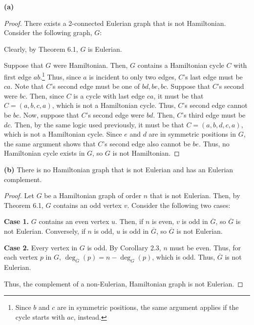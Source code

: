 \documentclass[12pt]{article}
\begin{document}
{\bf (a)}
\begin{proof} There exists a 2-connected Eulerian graph that is not Hamiltonian.
	Consider the following graph, $G$:
	\begin{center}
	\end{center}

	Clearly, by Theorem 6.1, $G$ is Eulerian.

	Suppose that $G$ were Hamiltonian.
	Then, $G$ contains a Hamiltonian cycle $C$ with first edge $ab$.\footnote{Since $b$ and $c$ are in symmetric positions, the same argument applies if the cycle starts with $ac$, instead.}
	Thus, since $a$ is incident to only two edges, $C$'s last edge must be $ca$.
	Note that $C$'s second edge must be one of $bd, be, bc$.
	Suppose that $C$'s second were $bc$.
	Then, since $C$ is a cycle with last edge $ca$, it must be that $C = (a, b, c, a)$, which is not a Hamiltonian cycle.
	Thus, $C$'s second edge cannot be $bc$.
	Now, suppose that $C$'s second edge were $bd$.
	Then, $C$'s third edge must be $dc$.
	Then, by the same logic used previously, it must be that $C = (a, b, d, c, a)$, which is not a Hamiltonian cycle.
	Since $e$ and $d$ are in symmetric positions in $G$, the same argument shows that $C$'s second edge also cannot be $be$.
	Thus, no Hamiltonian cycle exists in $G$, so $G$ is not Hamiltonian.
\end{proof}

{\bf (b)} There is no Hamiltonian graph that is not Eulerian and has an Eulerian complement.
\begin{proof}
	Let $G$ be a Hamiltonian graph of order $n$ that is not Eulerian.
	Then, by Theorem 6.1, $G$ contains an odd vertex $v$.
	Consider the following two cases:

	{\bf Case 1.} $G$ contains an even vertex $u$.
	Then, if $n$ is even, $v$ is odd in $\overline G$, so $\overline G$ is not Eulerian.
	Conversely, if $n$ is odd, $u$ is odd in $\overline G$, so $\overline G$ is not Eulerian.

	{\bf Case 2.} Every vertex in $G$ is odd.
	By Corollary 2.3, $n$ must be even.
	Thus, for each vertex $p$ in $G$, $\deg_{\overline G}(p) = n - \deg_G(p)$, which is odd.
	Thus, $\overline G$ is not Eulerian.

	Thus, the complement of a non-Eulerian, Hamiltonian graph is not Eulerian.
\end{proof}
\end{document}
